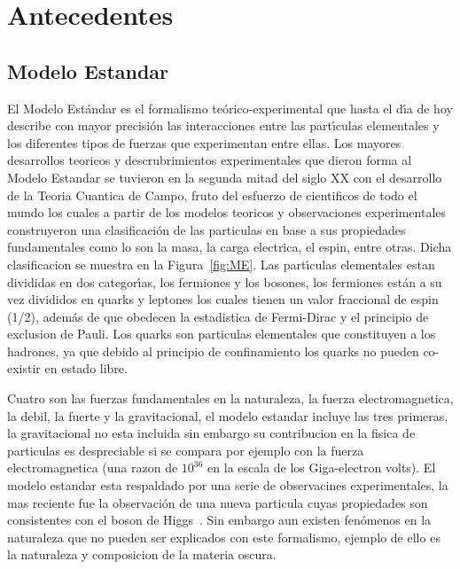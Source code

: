 \chapter{Antecedentes}

\section{Modelo Estandar}

El Modelo Est\'andar es el formalismo te\'orico-experimental que hasta el d\'{\i}a de hoy  describe con mayor precisi\'on las interacciones entre las part\'{\i}culas elementales y los diferentes tipos de fuerzas que experimentan entre ellas. Los mayores desarrollos teoricos y descrubrimientos experimentales que dieron forma al Modelo Estandar se tuvieron en la segunda mitad del siglo XX con el desarrollo de la Teoria Cuantica de Campo, fruto del esfuerzo de cientificos de todo el mundo los cuales a partir de los modelos teoricos y observaciones experimentales construyeron una clasificaci\'on de las particulas en base a sus propiedades fundamentales como lo son la masa, la carga electrica, el espin, entre otras. Dicha clasificacion se muestra en la Figura~\ref{fig:ME}. Las part\'{\i}culas elementales estan divididas en dos categor\'{\i}as, los fermiones y los bosones, los fermiones est\'an a su vez divididos en quarks y leptones los cuales tienen un valor fraccional de espin (1/2), adem\'as de que obedecen la estadistica de Fermi-Dirac y el principio de exclusion de Pauli. Los quarks son particulas elementales que constituyen a los hadrones, ya que debido al principio de confinamiento los quarks no pueden co-existir en estado libre.

Cuatro son las fuerzas fundamentales en la naturaleza, la fuerza electromagnetica, la debil, la fuerte y la gravitacional, el modelo estandar incluye las tres primeras, la gravitacional no esta incluida sin embargo su contribucion en la fisica de particulas es despreciable si se compara por ejemplo con la fuerza electromagnetica (una razon de $10^{36}$ en la escala de los Giga-electron volts). El modelo estandar esta respaldado por una serie de observacines experimentales, la mas reciente fue la observaci\'on de una nueva particula cuyas propiedades son consistentes con el boson de Higgs~\cite{higgs}. Sin embargo aun existen fen\'omenos en la naturaleza que no pueden ser explicados con este formalismo, ejemplo de ello es la naturaleza y composicion de la materia oscura.

